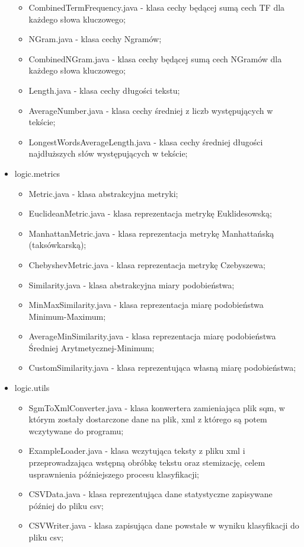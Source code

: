 \documentclass{classrep}
\begin{document}
\begin{itemize}
\begin{itemize}
		\item CombinedTermFrequency.java - klasa cechy będącej sumą cech TF dla każdego słowa kluczowego;
		\item NGram.java - klasa cechy Ngramów;
		\item CombinedNGram.java - klasa cechy będącej sumą cech NGramów dla każdego słowa kluczowego;
		\item Length.java - klasa cechy długości tekstu;
		\item AverageNumber.java - klasa cechy średniej z liczb występujących w tekście;
		\item LongestWordsAverageLength.java - klasa cechy średniej długości najdłuższych słów występujących w tekście;
	\end{itemize}
	\item logic.metrics
	\begin{itemize}
		\item Metric.java - klasa abstrakcyjna metryki;
		\item EuclideanMetric.java - klasa reprezentacja metrykę Euklidesowską;
		\item ManhattanMetric.java - klasa reprezentacja metrykę Manhattańską (taksówkarską);
		\item ChebyshevMetric.java - klasa reprezentacja metrykę Czebyszewa;
		\item Similarity.java - klasa abstrakcyjna miary podobieństwa;
		\item MinMaxSimilarity.java - klasa reprezentacja miarę podobieństwa Minimum-Maximum;
		\item AverageMinSimilarity.java - klasa reprezentacja miarę podobieństwa Średniej Arytmetycznej-Minimum;
		\item CustomSimilarity.java - klasa reprezentująca własną miarę podobieństwa;
	\end{itemize}
	\item logic.utils
	\begin{itemize}
		\item SgmToXmlConverter.java - klasa konwertera zamieniająca plik sqm, w którym zostały dostarczone dane na plik, xml z którego są potem wczytywane do programu;
		\item ExampleLoader.java - klasa wczytująca teksty z pliku xml i przeprowadzająca wstępną obróbkę tekstu oraz stemizację, celem usprawnienia późniejszego procesu klasyfikacji;
		\item CSVData.java - klasa reprezentująca dane statystyczne zapisywane później do pliku csv;
		\item CSVWriter.java - klasa zapisująca dane powstałe w wyniku klasyfikacji do pliku csv;
	\end{itemize}
\end{itemize}
\end{document}
